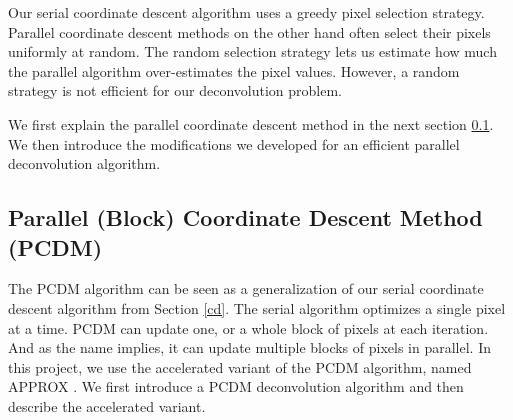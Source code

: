 Our serial coordinate descent algorithm uses a greedy pixel selection strategy. Parallel coordinate descent methods on the other hand often select their pixels uniformly at random. The random selection strategy lets us estimate how much the parallel algorithm over-estimates the pixel values\cite{richtarik2016parallel}. However, a random strategy is not efficient for our deconvolution problem.

We first explain the parallel coordinate descent method in the next section \ref{pcdm:pcdm}. We then introduce the modifications we developed for an efficient parallel deconvolution algorithm.




\subsection{Parallel (Block) Coordinate Descent Method (PCDM)} \label{pcdm:pcdm}
The PCDM algorithm can be seen as a generalization of our serial coordinate descent algorithm from Section \ref{cd}. The serial algorithm optimizes a single pixel at a time. PCDM can update one, or a whole block of pixels at each iteration. And as the name implies, it can update multiple blocks of pixels in parallel. In this project, we use the accelerated variant of the PCDM algorithm, named APPROX \cite{fercoq2015accelerated}. We first introduce a PCDM deconvolution algorithm and then describe the accelerated variant.

